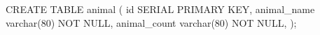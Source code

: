 CREATE TABLE animal
(
id SERIAL PRIMARY KEY,
animal_name varchar(80) NOT NULL,
animal_count varchar(80) NOT NULL,
);
